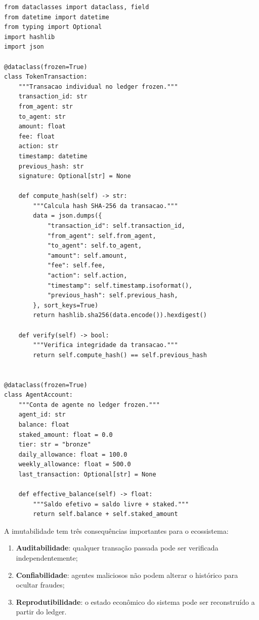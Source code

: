 \begin{lstlisting}[caption={Ledger frozen dataclass (SPEC-022)},label={lst:ledger-dataclass}]
from dataclasses import dataclass, field
from datetime import datetime
from typing import Optional
import hashlib
import json

@dataclass(frozen=True)
class TokenTransaction:
    """Transacao individual no ledger frozen."""
    transaction_id: str
    from_agent: str
    to_agent: str
    amount: float
    fee: float
    action: str
    timestamp: datetime
    previous_hash: str
    signature: Optional[str] = None

    def compute_hash(self) -> str:
        """Calcula hash SHA-256 da transacao."""
        data = json.dumps({
            "transaction_id": self.transaction_id,
            "from_agent": self.from_agent,
            "to_agent": self.to_agent,
            "amount": self.amount,
            "fee": self.fee,
            "action": self.action,
            "timestamp": self.timestamp.isoformat(),
            "previous_hash": self.previous_hash,
        }, sort_keys=True)
        return hashlib.sha256(data.encode()).hexdigest()

    def verify(self) -> bool:
        """Verifica integridade da transacao."""
        return self.compute_hash() == self.previous_hash


@dataclass(frozen=True)
class AgentAccount:
    """Conta de agente no ledger frozen."""
    agent_id: str
    balance: float
    staked_amount: float = 0.0
    tier: str = "bronze"
    daily_allowance: float = 100.0
    weekly_allowance: float = 500.0
    last_transaction: Optional[str] = None

    def effective_balance(self) -> float:
        """Saldo efetivo = saldo livre + staked."""
        return self.balance + self.staked_amount
\end{lstlisting}

A imutabilidade tem três consequências importantes para o
ecossistema:

\begin{enumerate}
\item \textbf{Auditabilidade}: qualquer transação passada pode
ser verificada independentemente;
\item \textbf{Confiabilidade}: agentes maliciosos não podem
alterar o histórico para ocultar fraudes;
\item \textbf{Reprodutibilidade}: o estado econômico do sistema
pode ser reconstruído a partir do ledger.
\end{enumerate}

